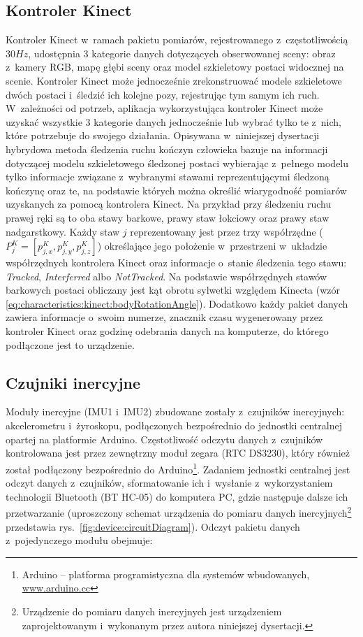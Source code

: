 \subsection{Kontroler Kinect}
Kontroler Kinect w~ramach pakietu pomiarów, rejestrowanego z~częstotliwością $30 Hz$, udostępnia 3 kategorie danych dotyczących obserwowanej sceny: obraz z~kamery RGB, mapę głębi sceny oraz model szkieletowy postaci widocznej na scenie. Kontroler Kinect może jednocześnie zrekonstruować modele szkieletowe dwóch postaci i~śledzić ich kolejne pozy, rejestrując tym samym ich ruch. W~zależności od potrzeb, aplikacja wykorzystująca kontroler Kinect może uzyskać wszystkie 3 kategorie danych jednocześnie lub wybrać tylko te z~nich, które potrzebuje do swojego działania. Opisywana w~niniejszej dysertacji hybrydowa metoda śledzenia ruchu kończyn człowieka bazuje na informacji dotyczącej modelu szkieletowego śledzonej postaci wybierając z~pełnego modelu tylko informacje związane z~wybranymi stawami reprezentującymi śledzoną kończynę oraz te, na podstawie których można określić wiarygodność pomiarów uzyskanych za pomocą kontrolera Kinect. Na przykład przy śledzeniu ruchu prawej ręki są to oba stawy barkowe, prawy staw łokciowy oraz prawy staw nadgarstkowy. Każdy staw $j$ reprezentowany jest przez trzy współrzędne ($P^K_j = [p^K_{j,x}, p^K_{j,y}, p^K_{j,z}]$) określające jego położenie w~przestrzeni w~układzie współrzędnych kontrolera Kinect oraz informacje o~stanie śledzenia tego stawu: \emph{Tracked}, \emph{Interferred} albo \emph{NotTracked}. Na podstawie współrzędnych stawów barkowych postaci obliczany jest kąt obrotu sylwetki względem Kinecta (wzór \ref{eq:characteristics:kinect:bodyRotationAngle}). Dodatkowo każdy pakiet danych zawiera informacje o~swoim numerze, znacznik czasu wygenerowany przez kontroler Kinect oraz godzinę odebrania danych na komputerze, do którego podłączone jest to urządzenie.
		
\subsection{Czujniki inercyjne}
Moduły inercyjne (IMU1 i~IMU2) zbudowane zostały z~czujników inercyjnych: akcelerometru i~żyroskopu, podłączonych bezpośrednio do jednostki centralnej opartej na platformie Arduino. Częstotliwość odczytu danych z~czujników kontrolowana jest przez zewnętrzny moduł zegara (RTC DS3230), który również został podłączony bezpośrednio do Arduino{\footnote{Arduino -- platforma programistyczna dla systemów wbudowanych, \url{www.arduino.cc}}}. Zadaniem jednostki centralnej jest odczyt danych z~czujników, sformatowanie ich i~wysłanie z~wykorzystaniem technologii Bluetooth (BT HC-05) do komputera PC, gdzie następuje dalsze ich przetwarzanie (uproszczony schemat urządzenia do pomiaru danych inercyjnych\footnote{Urządzenie do pomiaru danych inercyjnych jest urządzeniem zaprojektowanym i~wykonanym przez autora niniejszej dysertacji.} przedstawia rys.~\ref{fig:device:circuitDiagram}). Odczyt pakietu danych z~pojedynczego modułu obejmuje:

